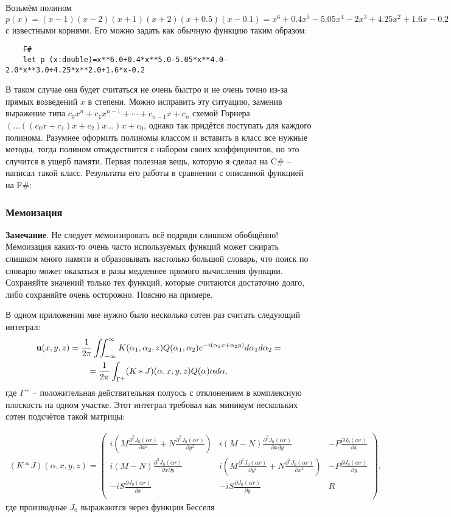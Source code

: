 \documentclass[a4paper, 12pt]{article}
\newcommand{\jone}[1]{\frac{\partial J_0(\alpha r)}{\partial #1}}
\newcommand{\jtwo}[1]{\frac{\partial^2 J_0(\alpha r)}{\partial #1^2}}
\newcommand{\jxy}{\frac{\partial^2 J_0(\alpha r)}{\partial x \partial y}}
\begin{document}
Возьмём полином $p(x)=(x-1)(x-2)(x+1)(x+2)(x+0.5)(x-0.1)=x^6+0.4x^5-5.05x^4-2x^3+4.25x^2+1.6x-0.2$ с известными корнями. Его можно задать как обычную функцию таким образом:
\begin{verbatim}
    F#
    let p (x:double)=x**6.0+0.4*x**5.0-5.05*x**4.0-2.0*x**3.0+4.25*x**2.0+1.6*x-0.2
\end{verbatim}
В таком случае она будет считаться не очень быстро и не очень точно из-за прямых возведений $x$ в степени.
Можно исправить эту ситуацию, заменив выражение типа $c_0x^n+c_1x^{n-1}+\cdots+c_{n-1}x+c_{n}$ схемой Горнера $(\dots((c_0x+c_1)x+c_2)x\dots)x+c_0$, однако так придётся поступать для каждого полинома.
Разумнее оформить полиномы классом и вставить в класс все нужные методы, тогда полином отождествится с набором своих коэффициентов, но это случится в ущерб памяти.
Первая полезная вещь, которую я сделал на C\# -- написал такой класс. Результаты его работы в сравнении с описанной функцией на F\#:

\subsubsection{Мемоизация}

{\bf Замечание}. Не следует мемоизировать всё подряди слишком обобщённо! Мемоизация каких-то очень часто используемых функций может сжирать слишком много памяти и образовывать настолько большой словарь, что поиск по словарю может оказаться в разы медленнее прямого вычисления функции. Сохраняйте значений только тех функций, которые считаются достаточно долго, либо сохраняйте очень осторожно. Поясню на примере.

В одном приложении мне нужно было несколько сотен раз считать следующий интеграл:
\begin{multline}
    {\bf u}(x,y,z)=\frac{1}{2\pi}\iint_{-\infty}^{\infty}K(\alpha_1,\alpha_2,z)Q(\alpha_1,\alpha_2)e^{-i(\alpha_1 x+\alpha_2 y)}d\alpha_1 d\alpha_2=\\
    =\frac{1}{2\pi}\int_{\Gamma^+}(K*J)(\alpha, x,y,z)Q(\alpha)\alpha d\alpha,
\end{multline}
где $\Gamma^+$ -- положительная действительная полуось с отклонением в комплексную плоскость на одном участке.
Этот интеграл требовал как минимум нескольких сотен подсчётов такой матрицы:

\begin{multline}
    (K*J)(\alpha, x,y,z)=
\begin{pmatrix} 
    i\left( M \jtwo{x} +N \jtwo{y}\right) & i(M-N)\jxy &-P\jone{x}\\ 
    i(M-N)\jxy& i\left( M \jtwo{y} +N \jtwo{x}\right) &-P\jone{y}\\
    -iS\jone{x}&-iS\jone{y} & R \\
\end{pmatrix},
\end{multline}
где производные $J_0$ выражаются через функции Бесселя
\end{document}
